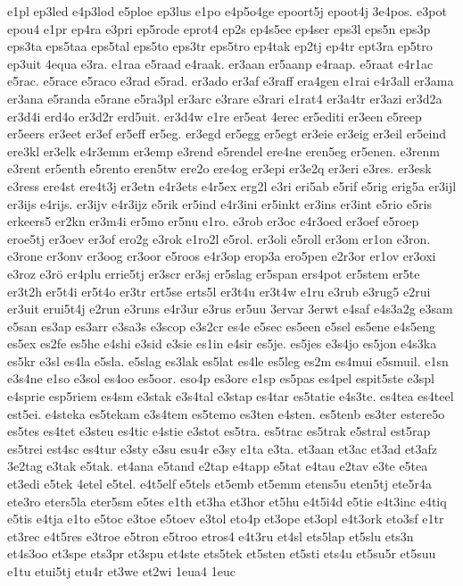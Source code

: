 {e1pl
ep3led
e4p3lod
e5ploe
ep3lus
e1po
e4p5o4ge
epoort5j
epoot4j
3e4pos.
e3pot
epou4
e1pr
ep4ra
e3pri
ep5rode
eprot4
ep2s
ep4s5ee
ep4ser
eps3l
eps5n
eps3p
eps3ta
eps5taa
eps5tal
eps5to
eps3tr
eps5tro
ep4tak
ep2tj
ep4tr
ept3ra
ep5tro
ep3uit
4equa
e3ra.
e1raa
e5raad
e4raak.
er3aan
er5aanp
e4raap.
e5raat
e4r1ac
e5rac.
e5race
e5raco
e3rad
e5rad.
er3ado
er3af
e3raff
era4gen
e1rai
e4r3all
er3ama
er3ana
e5randa
e5rane
e5ra3pl
er3arc
e3rare
e3rari
e1rat4
er3a4tr
er3azi
er3d2a
er3d4i
erd4o
er3d2r
erd5uit.
er3d4w
e1re
er5eat
4erec
er5editi
er3een
e5reep
er5eers
er3eet
er3ef
er5eff
er5eg.
er3egd
er5egg
er5egt
er3eie
er3eig
er3eil
er5eind
ere3kl
er3elk
e4r3emm
er3emp
e3rend
e5rendel
ere4ne
eren5eg
er5enen.
e3renm
e3rent
er5enth
e5rento
eren5tw
ere2o
ere4og
er3epi
er3e2q
er3eri
e3res.
er3esk
e3ress
ere4st
ere4t3j
er3etn
e4r3ets
e4r5ex
erg2l
e3ri
eri5ab
e5rif
e5rig
erig5a
er3ijl
er3ijs
e4rijs.
er3ijv
e4r3ijz
e5rik
er5ind
e4r3ini
er5inkt
er3ins
er3int
e5rio
e5ris
erkeers5
er2kn
er3m4i
er5mo
er5nu
e1ro.
e3rob
er3oc
e4r3oed
er3oef
e5roep
eroe5tj
er3oev
er3of
ero2g
e3rok
e1ro2l
e5rol.
er3oli
e5roll
er3om
er1on
e3ron.
e3rone
er3onv
er3oog
er3oor
e5roos
e4r3op
erop3a
ero5pen
e2r3or
er1ov
er3oxi
e3roz
e3rö
er4plu
errie5tj
er3scr
er3sj
er5slag
er5span
ers4pot
er5stem
er5te
er3t2h
er5t4i
er5t4o
er3tr
ert5se
erts5l
er3t4u
er3t4w
e1ru
e3rub
e3rug5
e2rui
er3uit
erui5t4j
e2run
e3runs
e4r3ur
e3rus
er5uu
3ervar
3erwt
e4saf
e4s3a2g
e3sam
e5san
es3ap
es3arr
e3sa3s
e3scop
e3s2cr
es4e
e5sec
es5een
e5sel
es5ene
e4s5eng
es5ex
es2fe
es5he
e4shi
e3sid
e3sie
es1in
e4sir
es5je.
es5jes
e3s4jo
es5jon
e4s3ka
es5kr
e3sl
es4la
e5sla.
e5slag
es3lak
es5lat
es4le
es5leg
es2m
es4mui
e5smuil.
e1sn
e3s4ne
e1so
e3sol
es4oo
es5oor.
eso4p
es3ore
e1sp
es5pas
es4pel
espit5ste
e3spl
e4sprie
esp5riem
es4sm
e3stak
e3s4tal
e3stap
es4tar
es5tatie
e4s3te.
es4tea
es4teel
est5ei.
e4steka
es5tekam
e3s4tem
es5temo
es3ten
e4sten.
es5tenb
es3ter
estere5o
es5tes
es4tet
e3steu
es4tic
e4stie
e3stot
es5tra.
es5trac
es5trak
e5stral
est5rap
es5trei
est4sc
es4tur
e3sty
e3su
esu4r
e3sy
e1ta
e3ta.
et3aan
et3ac
et3ad
et3afz
3e2tag
e3tak
e5tak.
et4ana
e5tand
e2tap
e4tapp
e5tat
e4tau
e2tav
e3te
e5tea
et3edi
e5tek
4etel
e5tel.
e4t5elf
e5tels
et5emb
et5emm
etens5u
eten5tj
ete5r4a
ete3ro
eters5la
eter5sm
e5tes
e1th
et3ha
et3hor
et5hu
e4t5i4d
e5tie
e4t3inc
e4tiq
e5tis
e4tja
e1to
e5toc
e3toe
e5toev
e3tol
eto4p
et3ope
et3opl
e4t3ork
eto3sf
e1tr
et3rec
e4t5res
e3troe
e5tron
e5troo
etros4
e4t3ru
et4sl
ets5lap
et5slu
ets3n
et4s3oo
et3spe
ets3pr
et3spu
et4ste
ets5tek
et5sten
et5sti
ets4u
et5su5r
et5suu
e1tu
etui5tj
etu4r
et3we
et2wi
1eua4
1euc
}
